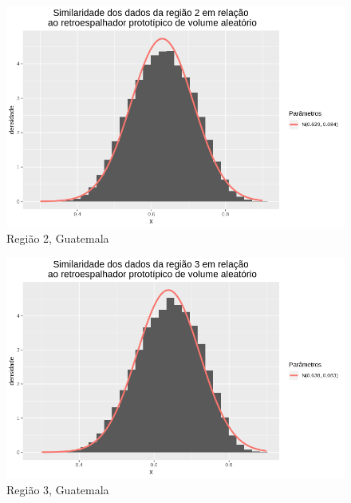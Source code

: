\documentclass[12pt]{article}
\begin{document}
\begin{figure}[!h]
    \centering
    \includegraphics[width = 0.95\linewidth]{../../Images/Report_18_12_17/rv_region2.png}
    \caption{Região 2, Guatemala}
    \label{fig:rv_r2}
\end{figure}

\begin{figure}[!h]
    \centering
    \vspace{0.15\linewidth}
    \includegraphics[width = 0.95\linewidth]{../../Images/Report_18_12_17/rv_region3.png}
    \caption{Região 3, Guatemala}
    \label{fig:rv_r3}
\end{figure}
\end{document}
